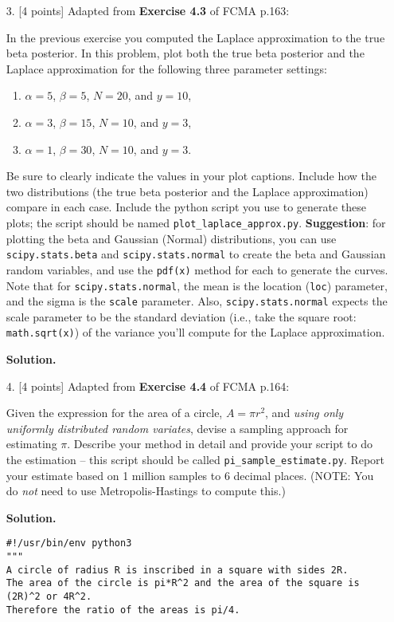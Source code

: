 \documentclass[10pt]{article}
\begin{document}
\begin{itemize}
\item[3.]  [4 points]
Adapted from {\bf Exercise 4.3} of FCMA p.163:

In the previous exercise you computed the Laplace approximation to the true beta posterior.  In this problem, plot both the true beta posterior and the Laplace approximation for the following three parameter settings:
\begin{enumerate}
\item $\alpha = 5$, $\beta = 5$, $N = 20$, and $y = 10$,
\item $\alpha = 3$, $\beta = 15$, $N = 10$, and $y = 3$,
\item $\alpha = 1$, $\beta = 30$, $N = 10$, and $y = 3$.
\end{enumerate}
Be sure to clearly indicate the values in your plot captions.  Include how the two distributions (the true beta posterior and the Laplace approximation) compare in each case.  Include the python script you use to generate these plots; the script should be named {\tt plot\_laplace\_approx.py}.  {\bf Suggestion}: for plotting the beta and Gaussian (Normal) distributions, you can use {\tt scipy.stats.beta} and {\tt scipy.stats.normal} to create the beta and Gaussian random variables, and use the {\tt pdf(x)} method for each to generate the curves.  Note that for {\tt scipy.stats.normal}, the mean is the location ({\tt loc}) parameter, and the sigma is the {\tt scale} parameter.  Also, {\tt scipy.stats.normal} expects the scale parameter to be the standard deviation (i.e., take the square root: {\tt math.sqrt(x)}) of the variance you'll compute for the Laplace approximation.


{\bf Solution.}




\item[4.]  [4 points]
Adapted from {\bf Exercise 4.4} of FCMA p.164:

Given the expression for the area of a circle, $A = \pi r^2$, and {\em using only uniformly distributed random variates}, devise a sampling approach for estimating $\pi$.  Describe your method in detail and provide your script to do the estimation -- this script should be called {\tt pi\_sample\_estimate.py}.  Report your estimate based on 1 million samples to 6 decimal places.  (NOTE: You do {\em not} need to use Metropolis-Hastings to compute this.)

{\bf Solution.} %

\begin{verbatim}
#!/usr/bin/env python3
"""
A circle of radius R is inscribed in a square with sides 2R.
The area of the circle is pi*R^2 and the area of the square is (2R)^2 or 4R^2.
Therefore the ratio of the areas is pi/4.


\end{verbatim}
\end{itemize}
\end{document}
